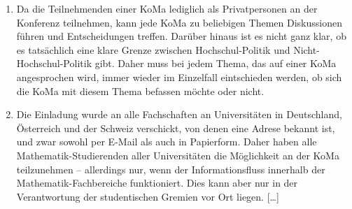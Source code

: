 \begin{enumerate}
\item Da die Teilnehmenden einer KoMa lediglich als Privatpersonen an der
	Konferenz teilnehmen, kann jede KoMa zu beliebigen Themen Diskussionen
	führen und Entscheidungen treffen. Darüber hinaus ist es nicht ganz
	klar, ob es tatsächlich eine klare Grenze zwischen Hochschul-Politik
	und Nicht-Hochschul-Politik gibt. Daher muss bei jedem Thema, das auf
	einer KoMa angesprochen wird, immer wieder im Einzelfall eintschieden
	werden, ob sich die KoMa mit diesem Thema befassen möchte oder nicht.

\item Die Einladung wurde an alle Fachschaften an Universitäten in
	Deutschland, Österreich und der Schweiz verschickt, von denen eine
	Adrese bekannt ist, und zwar sowohl per E-Mail als auch in Papierform.
	Daher haben alle Mathematik-Studierenden aller Universitäten die
	Möglichkeit an der KoMa teilzunehmen – allerdings nur, wenn der
	Informationsfluss innerhalb der Mathematik-Fachbereiche funktioniert.
	Dies kann aber nur in der Verantwortung der studentischen Gremien vor
	Ort liegen.  [\dots]
\end{enumerate}
